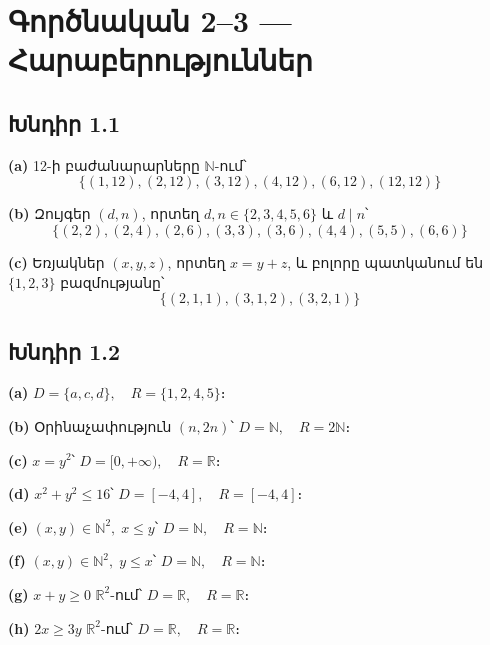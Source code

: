 \section*{Գործնական 2–3 — Հարաբերություններ}


\subsection*{Խնդիր 1.1}

\textbf{(a)} 12-ի բաժանարարները $\mathbb{N}$-ում՝
\[
  \boxed{\{(1,12),(2,12),(3,12),(4,12),(6,12),(12,12)\}}
\]

\textbf{(b)} Զույգեր $(d,n)$, որտեղ $d,n\in\{2,3,4,5,6\}$ և $d\mid n$՝
\[
  \boxed{\{(2,2),(2,4),(2,6),(3,3),(3,6),(4,4),(5,5),(6,6)\}}
\]

\textbf{(c)} Եռյակներ $(x,y,z)$, որտեղ $x=y+z$, և բոլորը պատկանում են $\{1,2,3\}$ բազմությանը՝
\[
  \boxed{\{(2,1,1),(3,1,2),(3,2,1)\}}
\]


\subsection*{Խնդիր 1.2}

\textbf{(a)} $\boxed{D=\{a,c,d\},\quad R=\{1,2,4,5\}}$։

\textbf{(b)} Օրինաչափություն $(n,2n)$՝ $\boxed{D=\mathbb{N},\quad R=2\mathbb{N}}$։

\textbf{(c)} $x=y^2$՝ $\boxed{D=[0,+\infty),\quad R=\mathbb{R}}$։

\textbf{(d)} $x^2+y^2\le 16$՝ $\boxed{D=[-4,4],\quad R=[-4,4]}$։

\textbf{(e)} $(x,y)\in\mathbb{N}^2,\; x\le y$՝ $\boxed{D=\mathbb{N},\quad R=\mathbb{N}}$։

\textbf{(f)} $(x,y)\in\mathbb{N}^2,\; y\le x$՝ $\boxed{D=\mathbb{N},\quad R=\mathbb{N}}$։

\textbf{(g)} $x+y\ge 0$ $\mathbb{R}^2$-ում՝ $\boxed{D=\mathbb{R},\quad R=\mathbb{R}}$։

\textbf{(h)} $2x\ge 3y$ $\mathbb{R}^2$-ում՝ $\boxed{D=\mathbb{R},\quad R=\mathbb{R}}$։


